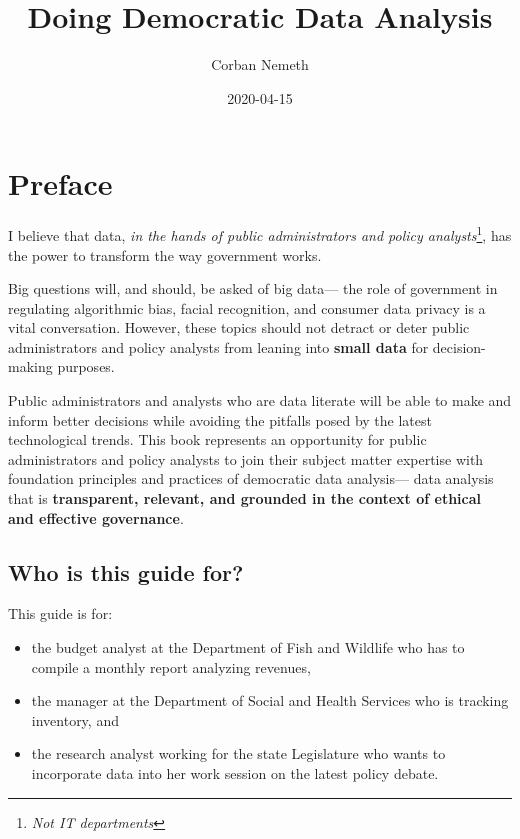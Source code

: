\documentclass[]{book}
\title{Doing Democratic Data Analysis}
\author{Corban Nemeth}
\date{2020-04-15}
\providecommand{\tightlist}{%
  \setlength{\itemsep}{0pt}\setlength{\parskip}{0pt}}
\begin{document}
\maketitle

{
\setcounter{tocdepth}{1}
\tableofcontents
}
\chapter*{Preface}\label{preface}

I believe that data, \emph{in the hands of public administrators and
policy analysts}\footnote{\emph{Not IT departments}}, has the power to
transform the way government works.

Big questions will, and should, be asked of big data--- the role of
government in regulating algorithmic bias, facial recognition, and
consumer data privacy is a vital conversation. However, these topics
should not detract or deter public administrators and policy analysts
from leaning into \textbf{small data} for decision-making purposes.

Public administrators and analysts who are data literate will be able to
make and inform better decisions while avoiding the pitfalls posed by
the latest technological trends. This book represents an opportunity for
public administrators and policy analysts to join their subject matter
expertise with foundation principles and practices of democratic data
analysis--- data analysis that is \textbf{transparent, relevant, and
grounded in the context of ethical and effective governance}.

\section*{Who is this guide for?}\label{who-is-this-guide-for}

This guide is for:

\begin{itemize}
\tightlist
\item
  the budget analyst at the Department of Fish and Wildlife who has to
  compile a monthly report analyzing revenues,
\item
  the manager at the Department of Social and Health Services who is
  tracking inventory, and
\item
  the research analyst working for the state Legislature who wants to
  incorporate data into her work session on the latest policy debate.
\end{itemize}
\end{document}
